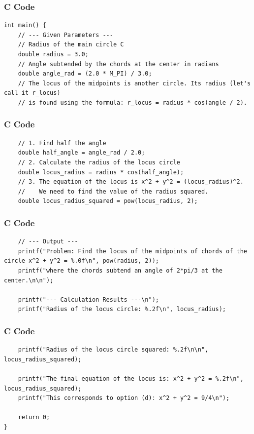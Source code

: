 \documentclass{beamer}
\begin{document}
\begin{frame}[fragile]
\frametitle{C Code}
\begin{lstlisting}
int main() {
    // --- Given Parameters ---
    // Radius of the main circle C
    double radius = 3.0; 
    // Angle subtended by the chords at the center in radians
    double angle_rad = (2.0 * M_PI) / 3.0;
    // The locus of the midpoints is another circle. Its radius (let's call it r_locus)
    // is found using the formula: r_locus = radius * cos(angle / 2).
\end{lstlisting}
\end{frame}

\begin{frame}[fragile]
\frametitle{C Code}
\begin{lstlisting}    
    // 1. Find half the angle
    double half_angle = angle_rad / 2.0;
    // 2. Calculate the radius of the locus circle
    double locus_radius = radius * cos(half_angle);
    // 3. The equation of the locus is x^2 + y^2 = (locus_radius)^2.
    //    We need to find the value of the radius squared.
    double locus_radius_squared = pow(locus_radius, 2);
\end{lstlisting}
\end{frame}

\begin{frame}[fragile]
\frametitle{C Code}
\begin{lstlisting}
    // --- Output ---
    printf("Problem: Find the locus of the midpoints of chords of the circle x^2 + y^2 = %.0f\n", pow(radius, 2));
    printf("where the chords subtend an angle of 2*pi/3 at the center.\n\n");
    
    printf("--- Calculation Results ---\n");
    printf("Radius of the locus circle: %.2f\n", locus_radius);
\end{lstlisting}
\end{frame}

\begin{frame}[fragile]
\frametitle{C Code}
\begin{lstlisting}
    printf("Radius of the locus circle squared: %.2f\n\n", locus_radius_squared);

    printf("The final equation of the locus is: x^2 + y^2 = %.2f\n", locus_radius_squared);
    printf("This corresponds to option (d): x^2 + y^2 = 9/4\n");

    return 0;
}
\end{lstlisting}
\end{frame}
\end{document}
